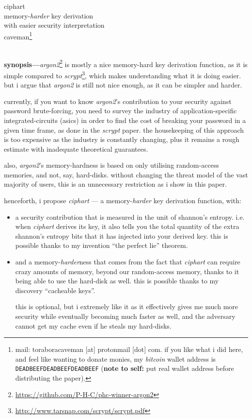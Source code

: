 \documentclass[twocolumn]{article}
\begin{document}
\SetInd{.15em}{1em}

\begin{center}
\Huge
ciphart\\
\LARGE
memory-\emph{harder} key derivation \\
with easier security interpretation\\
\normalsize
caveman\footnote{mail: toraboracaveman [at] protonmail [dot] com.  if you
like what i did here, and feel like wanting to donate monies, my
\emph{bitcoin} wallet address is \texttt{DEADBEEFDEADBEEFDEADBEEF}
(\textbf{note to self:} put real wallet address before distributing the
paper).}\\
\footnotesize
\DTMnow\\
\end{center}

\noindent\textbf{synopsis---}\emph{argon2}\footnote{\url{https://github.com/P-H-C/phc-winner-argon2}}
is mostly a nice memory-hard key derivation function, as it is simple
compared to
\emph{scrypt}\footnote{\url{http://www.tarsnap.com/scrypt/scrypt.pdf}},
which makes understanding what it is doing easier.  but i argue that
\emph{argon2} is still not nice enough, as it can be simpler and harder.

currently, if you want to know \emph{argon2}'s contribution to your
security against password brute-forcing, you need to survey the industry of
application-specific integrated-circuits (asics) in order to find the cost
of breaking your password in a given time frame, as done in the
\emph{scrypt} paper.  the housekeeping of this approach is too expensive as
the industry is constantly changing, plus it remains a rough estimate with
inadequate theoretical guarantees.

also, \emph{argon2}'s memory-hardness is based on only utilising
random-access memories, and not, say, hard-disks.  without changing the
threat model of the vast majority of users, this is an unnecessary
restriction as i show in this paper.

henceforth, i propose \emph{ciphart} --- a memory-\emph{harder} key
derivation function, with:
\begin{itemize}
    \item a security contribution that is measured in the unit of shannon's
    entropy.  i.e. when \emph{ciphart} derives its key, it also tells you
    the total quantity of the extra shannon's entropy bits that it has
    injected into your derived key.  this is possible thanks to my
    invention ``the perfect lie'' theorem.
    \item and a memory-\emph{harder}ness that comes from the fact that
    \emph{ciphart} can require crazy amounts of memory, beyond our
    random-access memory, thanks to it being able to use the hard-disk as
    well.  this is possible thanks to my discovery ``cacheable keys''.

    this is optional, but i extremely like it as it effectively gives me
    much more security while eventually becoming much faster as well, and
    the adversary cannot get my cache even if he steals my hard-disks.
\end{itemize}
\end{document}
